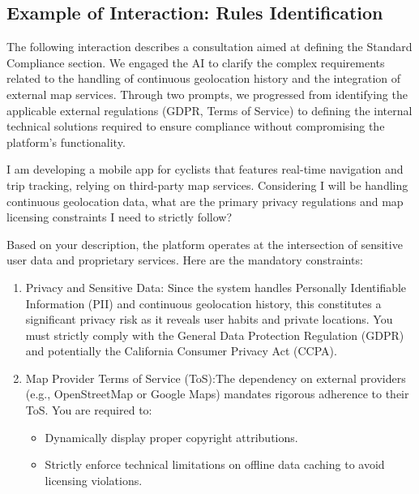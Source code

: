 \newpage
\subsection{Example of Interaction: Rules Identification}

The following interaction describes a consultation aimed at defining the Standard Compliance section. We engaged the AI to clarify the complex requirements related to the handling of continuous geolocation history and the integration of external map services. Through two prompts, we progressed from identifying the applicable external regulations (GDPR, Terms of Service) to defining the internal technical solutions required to ensure compliance without compromising the platform’s functionality.

\vspace{0.5cm}

\begin{PromptBox}
\quad I am developing a mobile app for cyclists that features real-time navigation and trip tracking, relying on third-party map services. Considering I will be handling continuous geolocation data, what are the primary privacy regulations and map licensing constraints I need to strictly follow?

\vspace{0.3cm}

\end{PromptBox}

\begin{ChatGPTBad}
\quad Based on your description, the platform operates at the intersection of sensitive user data and proprietary services. Here are the mandatory constraints:
\begin{enumerate}
    \item Privacy and Sensitive Data: Since the system handles Personally Identifiable Information (PII) and continuous geolocation history, this constitutes a significant privacy risk as it reveals user habits and private locations. You must strictly comply with the General Data Protection Regulation (GDPR) and potentially the California Consumer Privacy Act (CCPA).
    \item Map Provider Terms of Service (ToS):The dependency on external providers (e.g., OpenStreetMap or Google Maps) mandates rigorous adherence to their ToS. You are required to:
    \begin{itemize}
        \item Dynamically display proper copyright attributions.
        \item Strictly enforce technical limitations on offline data caching to avoid licensing violations.
    \end{itemize}
\end{enumerate}
    
\vspace{0.3cm}
\end{ChatGPTBad}



